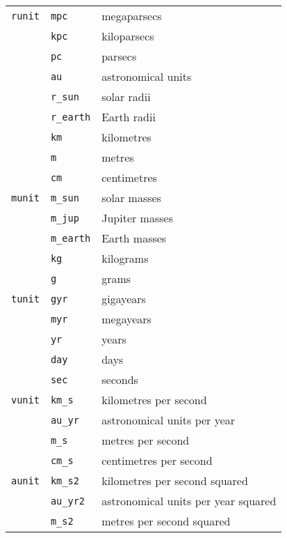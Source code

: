 \documentclass[a4paper]{article}
\newcommand{\var}[1]{\texttt{#1}}
\begin{document}
\begin{center}
\begin{supertabular}{|p{3cm}|p{3cm}|p{6cm}|}
\var{runit}     & \var{mpc}       & megaparsecs \\
                & \var{kpc}       & kiloparsecs \\
                & \var{pc}        & parsecs \\
                & \var{au}        & astronomical units \\
                & \var{r\_sun}    & solar radii \\
                & \var{r\_earth}  & Earth radii \\
                & \var{km}        & kilometres \\
                & \var{m}         & metres \\
                & \var{cm}        & centimetres \\ \hline
\var{munit}     & \var{m\_sun}    & solar masses \\ 
                & \var{m\_jup}    & Jupiter masses \\
                & \var{m\_earth}  & Earth masses \\
                & \var{kg}        & kilograms \\
                & \var{g}         & grams \\ \hline
\var{tunit}     & \var{gyr}       & gigayears \\
                & \var{myr}       & megayears \\
                & \var{yr}        & years \\
                & \var{day}       & days \\
                & \var{sec}       & seconds \\ \hline
\var{vunit}     & \var{km\_s}     & kilometres per second  \\
                & \var{au\_yr}    & astronomical units per year \\
                & \var{m\_s}      & metres per second \\
                & \var{cm\_s}     & centimetres per second \\ \hline
\var{aunit}     & \var{km\_s2}    & kilometres per second squared \\
                & \var{au\_yr2}   & astronomical units per year squared \\
                & \var{m\_s2}     & metres per second squared \\

\end{supertabular}
\end{center}
\end{document}
